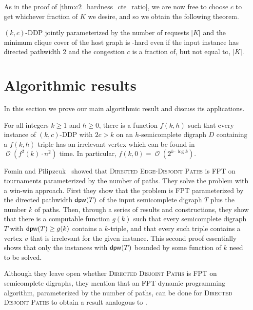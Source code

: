 \documentclass[a4paper,UKenglish,cleveref, autoref, thm-restate]{lipics-v2021}
\DeclareMathOperator{\dpw}{\text{\sf dpw}\xspace}
\DeclareMathOperator{\Ocal}{\mathcal{O}\xspace}
\renewcommand{\FPT}{{\sf FPT}\xspace}
\newcommand{\pname}[1]{{\sc #1}}
\newcommand{\congestion}{c}
\begin{document}
    As in the proof of \autoref{thm:c2_hardness_cte_ratio}, we are now free to choose
    $\congestion$ to get whichever fraction of $K$ we desire, and so we obtain the
    following theorem.

    \begin{theorem}
      \label{thm:w1h_congestion}
      \pname{$(k,c)$-DDP} jointly parameterized by the number of requests
      $|K|$ and the minimum clique cover of the host graph is \W[1]-hard even if the input instance has directed pathwidth 2 and the congestion $\congestion$ is a fraction of, but not equal to, $|K|$.
    \end{theorem}

  
\section{Algorithmic results}
\label{sec:algo}

In this section we prove our main algorithmic result and discuss its applications.
\begin{theorem}\label{thm:FPT-large-congestion}
  For all integers $k \geq 1$ and $h \geq 0$, there is a function $f(k,h)$ such
  that every instance of $(k,c)$-\textsc{DDP} with $2c > k$ on an
  $h$-semicomplete digraph $D$ containing a $f(k,h)$-triple has an irrelevant
  vertex which can be found in $\Ocal(f^2(k) \cdot n^2)$ time.
  In particular, $f(k,0) = \Ocal(2^{k\cdot \log k})$.
\end{theorem}

Fomin and Pilipzcuk~\cite[Theorem 6.3]{FominP19} showed that \textsc{Directed Edge-Disjoint Paths} is \FPT  on tournaments parameterized by the number of paths.
They solve the problem with a win-win approach.
First they show that the problem is \FPT parameterized by the directed pathwidth $\dpw(T)$ of the input semicomplete digraph $T$ plus the number $k$ of paths.
Then, through a series of results and constructions, they show that there is a computable function $g(k)$ such that every semicomplete digraph $T$ with $\dpw(T) \geq g(k)$ contains a $k$-triple, and that every such triple contains a vertex $v$ that is irrelevant for the given instance.
This second proof essentially shows that only the instances with $\dpw(T)$ bounded by some function of $k$ need to be solved.

Although they leave open whether \textsc{Directed Disjoint Paths} is \FPT on semicomplete digraphs, they mention that an \FPT dynamic programming algorithm, parameterized by the number of paths, can be done for \textsc{Directed Disjoint Paths} to obtain a result analogous to \cite[Theorem 6.3]{FominP19}.
\end{document}
